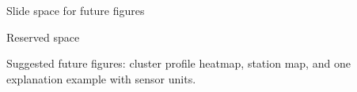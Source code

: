 \documentclass[aspectratio=169]{beamer}
\begin{document}
\begin{frame}{Slide space for future figures}
  \begin{block}{Reserved space}
    \vspace{1em}
    \centering
  \end{block}

  \vspace{0.6em}
  \footnotesize Suggested future figures: cluster profile heatmap, station map, and one explanation example with sensor units.
\end{frame}
\end{document}

